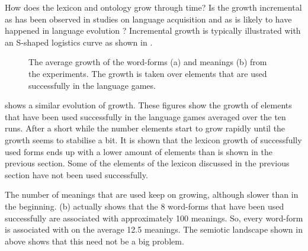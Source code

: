 How does the lexicon and ontology grow through time? Is the growth incremental as has been observed in studies on language acquisition and as is likely to have happened in language evolution \citep{aitchison:1996}? Incremental growth is typically illustrated with an S-shaped logistics curve as shown in .

\begin{figure}
\centering
{}
\caption{The average growth of the word-forms (a) and meanings (b) from the experiments. The growth is taken over elements that are used successfully in the language games.}
\label{f:st:growthlex}
\end{figure}

 shows a similar evolution of growth. These figures show the growth of elements that have been used successfully in the language games averaged over the ten runs. After a short while the number elements start to grow rapidly until the growth seems to stabilise a bit. It is shown that the lexicon growth of successfully used forms ends up with a lower amount of elements than is shown in the previous section. Some of the elements of the lexicon discussed in the previous section have not been used successfully.

The number of meanings that are used keep on growing, although slower than in the beginning.  (b) actually shows that the 8 word-forms that have been used successfully are associated with approximately 100 meanings. So, every word-form is associated with on the average 12.5 meanings. The semiotic landscape shown in above shows that this need not be a big problem.

